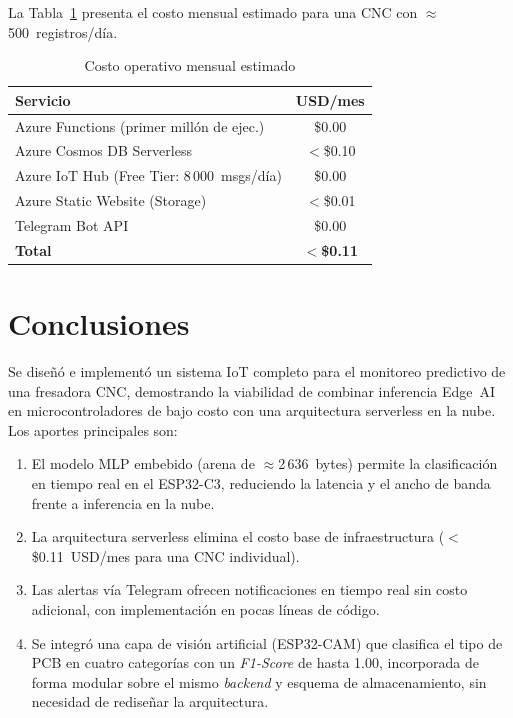 \documentclass[journal,transmag]{IEEEtran}
\begin{document}
La Tabla~\ref{tab:costo} presenta el costo mensual estimado para una CNC
con $\approx$500~registros/d\'ia.

\begin{table}[!t]
\caption{Costo operativo mensual estimado}
\label{tab:costo}
\centering
\renewcommand{\arraystretch}{1.2}
\begin{tabular}{lc}
\toprule
\textbf{Servicio} & \textbf{USD/mes} \\
\midrule
Azure Functions (primer mill\'on de ejec.)  & \$0.00 \\
Azure Cosmos DB Serverless                   & $<$\$0.10 \\
Azure IoT Hub (Free Tier: 8\,000~msgs/d\'ia) & \$0.00 \\
Azure Static Website (Storage)              & $<$\$0.01 \\
Telegram Bot API                             & \$0.00 \\
\midrule
\textbf{Total}                               & $<$\textbf{\$0.11} \\
\bottomrule
\end{tabular}
\end{table}



\section{Conclusiones}

Se dise\~n\'o e implement\'o un sistema IoT completo para el monitoreo predictivo de una fresadora CNC, demostrando la viabilidad de combinar inferencia Edge~AI en microcontroladores de bajo costo con una arquitectura serverless en la nube. Los aportes principales son:

\begin{enumerate}
  \item El modelo MLP embebido (arena de $\approx$2\,636~bytes) permite la clasificaci\'on en tiempo real en el ESP32-C3, reduciendo la latencia y el ancho de banda frente a inferencia en la nube.
  \item La arquitectura serverless elimina el costo base de infraestructura ($<$\$0.11~USD/mes para una CNC individual).
  \item Las alertas v\'ia Telegram ofrecen notificaciones en tiempo real sin costo adicional, con implementaci\'on en pocas l\'ineas de c\'odigo.
  \item Se integr\'o una capa de visi\'on artificial (ESP32-CAM) que clasifica el tipo de PCB en cuatro categor\'ias con un \textit{F1-Score} de hasta 1.00, incorporada de forma modular sobre el mismo \textit{backend} y esquema de almacenamiento, sin necesidad de redise\~nar la arquitectura.
\end{enumerate}
\end{document}
